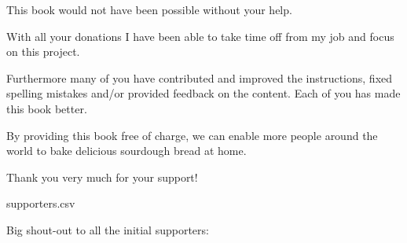 This book would not have been possible without your help.

With all your donations I have been able to take time off from my job and
focus on this project.

Furthermore many of you have contributed and improved the
instructions, fixed spelling mistakes and/or provided
feedback on the content. Each of you has made this book
better.

By providing this book free of charge,
we can enable more people around the world to bake delicious sourdough
bread at home.

Thank you very much for your support!\\

\begin{filecontents}{supporters.csv}
  \end{filecontents}

  {\large Big shout-out to all the initial supporters:}


